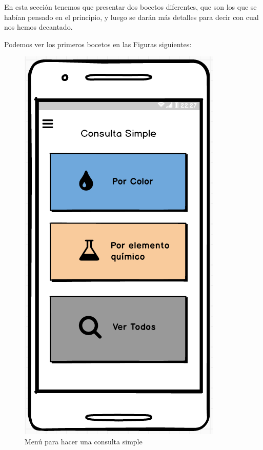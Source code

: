 En esta sección tenemos que presentar dos bocetos diferentes, que son los que se habían pensado en el principio, y luego se darán más detalles para decir con cual nos hemos decantado. 

Podemos ver los primeros bocetos en las Figuras siguientes:

\newpage
\begin{multicols}{3}
    \begin{figure}[H]
    \centering
    \includegraphics[scale=0.5]{imagenes/diseno/simpleQuery.png}
    \caption{Menú para hacer una consulta simple}
    \label{fig:consultaSimple}
    \end{figure}
    

\end{multicols}
